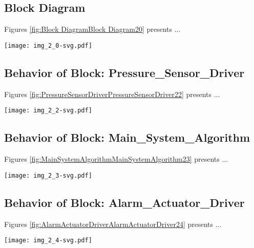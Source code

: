 \subsection{Block Diagram}
Figures \ref{fig:Block DiagramBlock Diagram20} presents ...
\begin{figure*}[htb]
\centering
\texttt{[image: img\_2\_0-svg.pdf]}
\caption{Diagram "Block Diagram"}
\label{fig:Block DiagramBlock Diagram20}
\end{figure*}

\subsection{Behavior of Block: Pressure\_Sensor\_Driver}
Figures \ref{fig:PressureSensorDriverPressureSensorDriver22} presents ...
\begin{figure*}[htb]
\centering
\texttt{[image: img\_2\_2-svg.pdf]}
\caption{Diagram "Behavior of Block: Pressure\_Sensor\_Driver"}
\label{fig:PressureSensorDriverPressureSensorDriver22}
\end{figure*}

\subsection{Behavior of Block: Main\_System\_Algorithm}
Figures \ref{fig:MainSystemAlgorithmMainSystemAlgorithm23} presents ...
\begin{figure*}[htb]
\centering
\texttt{[image: img\_2\_3-svg.pdf]}
\caption{Diagram "Behavior of Block: Main\_System\_Algorithm"}
\label{fig:MainSystemAlgorithmMainSystemAlgorithm23}
\end{figure*}

\subsection{Behavior of Block: Alarm\_Actuator\_Driver}
Figures \ref{fig:AlarmActuatorDriverAlarmActuatorDriver24} presents ...
\begin{figure*}[htb]
\centering
\texttt{[image: img\_2\_4-svg.pdf]}
\caption{Diagram "Behavior of Block: Alarm\_Actuator\_Driver"}
\label{fig:AlarmActuatorDriverAlarmActuatorDriver24}
\end{figure*}

